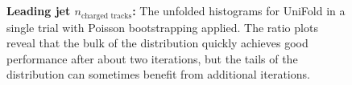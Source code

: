 \begin{figure}[]
\centering
\ContinuedFloat
{}\\
\\
\caption{\textbf{Leading jet $n_{\text{charged tracks}}$:} The unfolded histograms for UniFold in a single trial with Poisson bootstrapping applied. The ratio plots reveal that the bulk of the distribution quickly achieves good performance after about two iterations, but the tails of the distribution can sometimes benefit from additional iterations.}
\label{fig:num_iterations:ntracks_ratios}
\end{figure}



